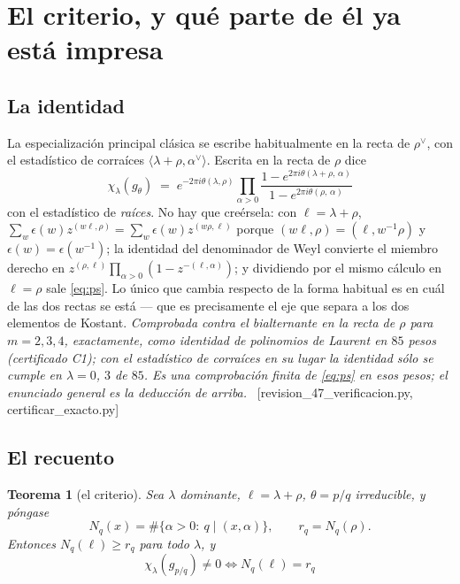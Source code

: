 \documentclass[11pt,a4paper]{article}
\newtheorem{theorem}{Teorema}[section]
\newcommand{\ver}[1]{\unskip\penalty0\ \textcolor{azul}{\small\textsf{[#1]}}}
\begin{document}
\section{El criterio, y qué parte de él ya está impresa}\label{sec:crit}

\subsection*{La identidad}

La especialización principal clásica se escribe habitualmente en la recta de $\rho^\vee$, con el
estadístico de corraíces $\langle\lambda+\rho,\alpha^\vee\rangle$. Escrita en la recta de $\rho$
dice
\begin{equation}\label{eq:ps}
\boxed{\;\chi_\lambda(g_\theta)\;=\;e^{-2\pi i\theta(\lambda,\rho)}\prod_{\alpha>0}
\frac{1-e^{2\pi i\theta(\lambda+\rho,\,\alpha)}}{1-e^{2\pi i\theta(\rho,\,\alpha)}}\;}
\end{equation}
con el estadístico de \emph{raíces}. No hay que creérsela: con $\ell=\lambda+\rho$,
$\sum_w\epsilon(w)z^{(w\ell,\rho)}=\sum_w\epsilon(w)z^{(w\rho,\ell)}$ porque
$(w\ell,\rho)=(\ell,w^{-1}\rho)$ y $\epsilon(w)=\epsilon(w^{-1})$; la identidad del denominador de
Weyl convierte el miembro derecho en
$z^{(\rho,\ell)}\prod_{\alpha>0}(1-z^{-(\ell,\alpha)})$; y dividiendo por el mismo cálculo en
$\ell=\rho$ sale \eqref{eq:ps}. Lo único que cambia respecto de la forma habitual es en cuál de las
dos rectas se está --- que es precisamente el eje que separa a los dos elementos de Kostant.
\emph{Comprobada contra el bialternante en la recta de $\rho$ para $m=2,3,4$, exactamente, como
identidad de polinomios de Laurent en $85$ pesos (certificado C1); con el estadístico de corraíces
en su lugar la identidad sólo se cumple en $\lambda=0$, $3$ de $85$. Es una comprobación finita de
\eqref{eq:ps} en esos pesos; el enunciado general es la deducción de arriba.}
\ver{revision\_47\_verificacion.py, certificar\_exacto.py}

\subsection*{El recuento}

\begin{theorem}[el criterio]\label{thm:crit}
Sea $\lambda$ dominante, $\ell=\lambda+\rho$, $\theta=p/q$ irreducible, y póngase
\[
N_q(x)=\#\{\alpha>0:\ q\mid(x,\alpha)\},\qquad r_q=N_q(\rho) .
\]
Entonces $N_q(\ell)\ge r_q$ para todo $\lambda$, y
\begin{equation}\label{eq:crit}
\boxed{\;\chi_\lambda(g_{p/q})\neq0 \iff N_q(\ell)=r_q\;}
\end{equation}
\end{theorem}
\end{document}
